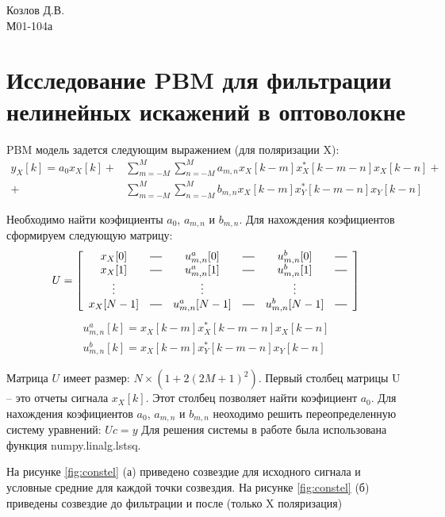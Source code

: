\documentclass[a4paper, 12pt]{extarticle}
\newcommand*{\horzbar}{\rule[.5ex]{2.5ex}{0.5pt}}
\begin{document}
\begin{flushright}
	Козлов Д.В.\\М01-104а	
\end{flushright}


\section*{Исследование PBM для фильтрации нелинейных искажений в оптоволокне}
PBM модель задется следующим выражением (для поляризации X):
\begin{equation}
\begin{aligned}
    y_{X}[k] = a_0 x_{X}[k] + &\sum_{m=-M}^{M} \sum_{n=-M}^{M} a_{m,n} x_{X}[k - m]
    x^*_{X}[k-m-n] x_{X}[k-n] + \\
    + &\sum_{m=-M}^{M} \sum_{n=-M}^{M} b_{m,n} x_{X}[k - m]
    x^*_{Y}[k-m-n] x_{Y}[k-n]
\end{aligned}
\end{equation}

Необходимо найти коэфициенты $a_0$, $a_{m,n}$ и $b_{m,n}$.
Для нахождения коэфициентов сформируем следующую матрицу:
\[
U =
\left[
  \begin{array}{cccccc}
    x_X[0] & \horzbar & u^a_{m,n}[0] & \horzbar & u^b_{m,n}[0] & \horzbar\\
    x_X[1] &\horzbar & u^a_{m,n}[1] & \horzbar & u^b_{m,n}[1] & \horzbar\\
    \vdots &        &  \vdots        &        &  \vdots       \\
    x_X[N-1] &\horzbar & u^a_{m,n}[N-1] & \horzbar & u^b_{m,n}[N-1] & \horzbar\\
  \end{array}
\right]
\]
\begin{equation}
    \begin{aligned}
        u^a_{m,n}[k] = x_{X}[k - m] x^*_{X}[k-m-n] x_{X}[k-n]\\
        u^b_{m,n}[k] = x_{X}[k - m] x^*_{Y}[k-m-n] x_{Y}[k-n]
    \end{aligned}
    \end{equation}

Матрица $U$ имеет размер: $N \times (1+2(2M+1)^2)$.
Первый столбец матрицы U -- это отчеты сигнала $x_X[k]$.
Этот столбец позволяет найти коэфициент $a_0$.
Для нахождения коэфициентов $a_0$, $a_{m,n}$ и $b_{m,n}$
неоходимо решить переопределенную систему уравнений:
$U c = y$
Для решения системы в работе была использована функция numpy.linalg.lstsq.
 
На рисунке \ref{fig:constel} (а) приведено созвездие для исходного
сигнала и условные средние для каждой точки созвездия. На рисунке 
\ref{fig:constel} (б) приведены созвездие до фильтрации и после
(только X поляризация)
\end{document}
